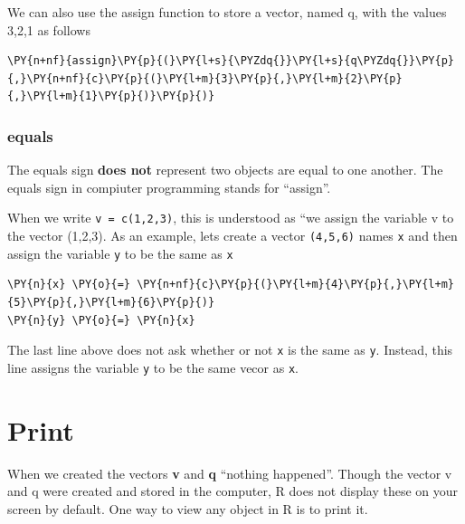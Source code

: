 We can also use the assign function to store a vector, named q, with the
values 3,2,1 as follows

    \begin{tcolorbox}[breakable, size=fbox, boxrule=1pt, pad at break*=1mm,colback=cellbackground, colframe=cellborder]
\begin{Verbatim}[commandchars=\\\{\}]
\PY{n+nf}{assign}\PY{p}{(}\PY{l+s}{\PYZdq{}}\PY{l+s}{q\PYZdq{}}\PY{p}{,}\PY{n+nf}{c}\PY{p}{(}\PY{l+m}{3}\PY{p}{,}\PY{l+m}{2}\PY{p}{,}\PY{l+m}{1}\PY{p}{)}\PY{p}{)}
\end{Verbatim}
\end{tcolorbox}

    \hypertarget{equals}{%
\subsubsection{equals}\label{equals}}

The equals sign \textbf{does not} represent two objects are equal to one
another. The equals sign in compiuter programming stands for ``assign''.

When we write \texttt{v\ =\ c(1,2,3)}, this is understood as ``we assign
the variable v to the vector (1,2,3). As an example, lets create a
vector \texttt{(4,5,6)} names \texttt{x} and then assign the variable
\texttt{y} to be the same as \texttt{x}

    \begin{tcolorbox}[breakable, size=fbox, boxrule=1pt, pad at break*=1mm,colback=cellbackground, colframe=cellborder]
\begin{Verbatim}[commandchars=\\\{\}]
\PY{n}{x} \PY{o}{=} \PY{n+nf}{c}\PY{p}{(}\PY{l+m}{4}\PY{p}{,}\PY{l+m}{5}\PY{p}{,}\PY{l+m}{6}\PY{p}{)}
\PY{n}{y} \PY{o}{=} \PY{n}{x}
\end{Verbatim}
\end{tcolorbox}

    The last line above does not ask whether or not \texttt{x} is the same
as \texttt{y}. Instead, this line assigns the variable \texttt{y} to be
the same vecor as \texttt{x}.

    \hypertarget{print}{%
\section{Print}\label{print}}

When we created the vectors \textbf{v} and \textbf{q} ``nothing
happened''. Though the vector v and q were created and stored in the
computer, R does not display these on your screen by default. One way to
view any object in R is to print it.


